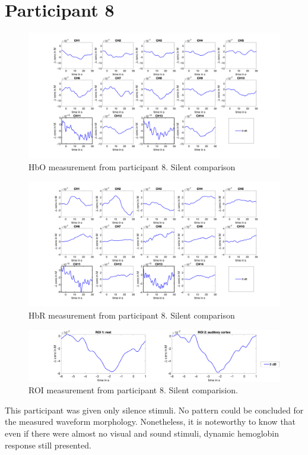 \newpage


\section {Participant 8}

\begin{figure}[H]
  \centering
    \includegraphics[scale=.4]{bilder/HbO_Mole/sub_luca2_s_HbO.png}
  \caption{HbO measurement from participant 8. Silent comparison}
  \label{fig:somesignal}
\end{figure}

\begin{figure}[H]
  \centering
    \includegraphics[scale=.4]{bilder/HbR_Mole/sub_luca2_s_HbR.png}
  \caption{HbR measurement from participant 8. Silent comparison}
\end{figure}

\begin{figure}[H]
  \centering
    \includegraphics[scale=.29]{bilder/ROI/sub_luca2_s_HbO.png}
  \caption{ROI measurement from participant 8. Silent comparision.}
\end{figure}

This participant was given only silence stimuli. No pattern could be concluded for the measured waveform morphology. Nonetheless, it is noteworthy to know that even if there were almost no visual and sound stimuli, dynamic hemoglobin response still presented.